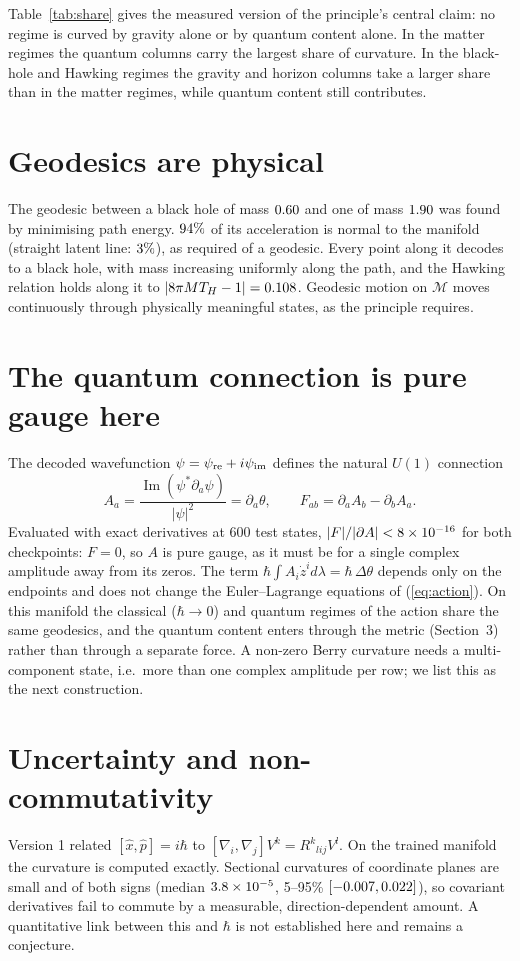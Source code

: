 \documentclass[11pt]{article}
\begin{document}
Table~\ref{tab:share} gives the measured version of the principle's central claim: no regime is
curved by gravity alone or by quantum content alone. In the matter regimes the quantum columns
carry the largest share of curvature. In the black-hole and Hawking regimes the gravity and horizon
columns take a larger share than in the matter regimes, while quantum content still contributes.

\section{Geodesics are physical}
The geodesic between a black hole of mass $0.60$ and one of mass $1.90$ was found by
minimising path energy. $94\%$ of its acceleration is normal to the manifold (straight
latent line: $3\%$), as required of a geodesic. Every point along it decodes to a black
hole, with mass increasing uniformly along the path, and the Hawking relation holds along it to
$|8\pi MT_H-1|=0.108$. Geodesic motion on $\mathcal M$ moves continuously through physically
meaningful states, as the principle requires.

\section{The quantum connection is pure gauge here}
The decoded wavefunction $\psi=\psi_{\rm re}+i\psi_{\rm im}$ defines the natural $U(1)$ connection
\begin{equation}
A_a=\frac{\operatorname{Im}(\psi^*\partial_a\psi)}{|\psi|^2}=\partial_a\theta,\qquad F_{ab}=\partial_aA_b-\partial_bA_a.
\end{equation}
Evaluated with exact derivatives at 600 test states, $|F|/|\partial A|<8\times10^{-16}$ for both checkpoints:
$F=0$, so $A$ is pure gauge, as it must be for a single complex amplitude away from its zeros. The
term $\hbar\!\int\!A_i\dot z^i d\lambda=\hbar\,\Delta\theta$ depends only on the endpoints and
does not change the Euler--Lagrange equations of (\ref{eq:action}). On this manifold the classical
($\hbar\to0$) and quantum regimes of the action share the same geodesics, and the quantum
content enters through the metric (Section~3) rather than through a separate force. A non-zero
Berry curvature needs a multi-component state, i.e.\ more than one complex amplitude per row; we
list this as the next construction.

\section{Uncertainty and non-commutativity}
Version 1 related $[\hat x,\hat p]=i\hbar$ to $[\nabla_i,\nabla_j]V^k=R^k{}_{lij}V^l$. On the
trained manifold the curvature is computed exactly. Sectional curvatures of coordinate planes are
small and of both signs (median $3.8\times10^{-5}$, 5--95\% $[-0.007,0.022]$), so covariant derivatives fail
to commute by a measurable, direction-dependent amount. A quantitative link between this and
$\hbar$ is not established here and remains a conjecture.
\end{document}

